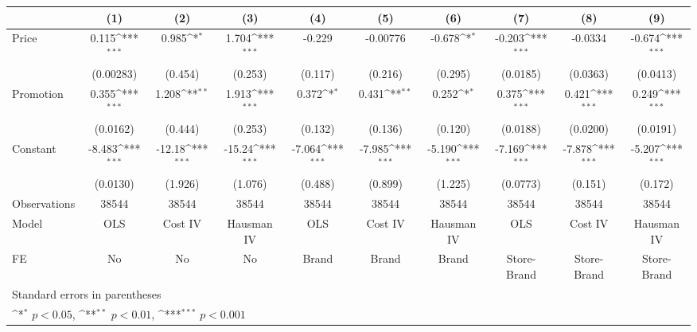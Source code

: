 {
\def\sym#1{\ifmmode^{#1}\else\(^{#1}\)\fi}
\begin{tabular}{l*{9}{c}}
\hline\hline
                    &\multicolumn{1}{c}{(1)}         &\multicolumn{1}{c}{(2)}         &\multicolumn{1}{c}{(3)}         &\multicolumn{1}{c}{(4)}         &\multicolumn{1}{c}{(5)}         &\multicolumn{1}{c}{(6)}         &\multicolumn{1}{c}{(7)}         &\multicolumn{1}{c}{(8)}         &\multicolumn{1}{c}{(9)}         \\
\hline
Price               &       0.115\sym{***}&       0.985\sym{*}  &       1.704\sym{***}&      -0.229         &    -0.00776         &      -0.678\sym{*}  &      -0.203\sym{***}&     -0.0334         &      -0.674\sym{***}\\
                    &   (0.00283)         &     (0.454)         &     (0.253)         &     (0.117)         &     (0.216)         &     (0.295)         &    (0.0185)         &    (0.0363)         &    (0.0413)         \\
[1em]
Promotion           &       0.355\sym{***}&       1.208\sym{**} &       1.913\sym{***}&       0.372\sym{*}  &       0.431\sym{**} &       0.252\sym{*}  &       0.375\sym{***}&       0.421\sym{***}&       0.249\sym{***}\\
                    &    (0.0162)         &     (0.444)         &     (0.253)         &     (0.132)         &     (0.136)         &     (0.120)         &    (0.0188)         &    (0.0200)         &    (0.0191)         \\
[1em]
Constant            &      -8.483\sym{***}&      -12.18\sym{***}&      -15.24\sym{***}&      -7.064\sym{***}&      -7.985\sym{***}&      -5.190\sym{***}&      -7.169\sym{***}&      -7.878\sym{***}&      -5.207\sym{***}\\
                    &    (0.0130)         &     (1.926)         &     (1.076)         &     (0.488)         &     (0.899)         &     (1.225)         &    (0.0773)         &     (0.151)         &     (0.172)         \\
\hline
Observations        &       38544         &       38544         &       38544         &       38544         &       38544         &       38544         &       38544         &       38544         &       38544         \\
Model               &         OLS         &     Cost IV         &  Hausman IV         &         OLS         &     Cost IV         &  Hausman IV         &         OLS         &     Cost IV         &  Hausman IV         \\
FE                  &          No         &          No         &          No         &       Brand         &       Brand         &       Brand         & Store-Brand         & Store-Brand         & Store-Brand         \\
\hline\hline
\multicolumn{10}{l}{\footnotesize Standard errors in parentheses}\\
\multicolumn{10}{l}{\footnotesize \sym{*} \(p<0.05\), \sym{**} \(p<0.01\), \sym{***} \(p<0.001\)}\\
\end{tabular}
}
